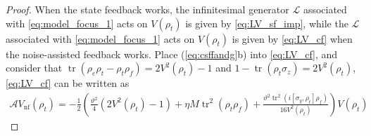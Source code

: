 \documentclass[]{elsarticle}
\begin{document}
\begin{proof}
	When the state feedback works, the infinitesimal generator $\mathcal{L}$ associated with \eqref{eq:model_focus_1} acts on $V(\rho_{t})$ is given by \eqref{eq:LV_sf_imp}, while the $\mathcal{L}$ associated with \eqref{eq:model_focus_1} acts on $V(\rho_{t})$ is given by \eqref{eq:LV_cf} when the noise-assisted feedback works. Place (\ref{eq:csffandg}b) into \eqref{eq:LV_cf}, and consider that $\operatorname{tr}\left(\rho_{e}\rho_{t}-\rho_t\rho_{f}\right)=2V^2\left(\rho_{t}\right)-1$ and $1-\operatorname{tr}(\rho_{t}\sigma_z)=2V^2\left(\rho_{t}\right)$, \eqref{eq:LV_cf} can be written as	
	\begin{equation}\label{eq:LV_cf_final}
		\begin{aligned}
			\mathcal{A}V_{\mathrm{nf}}\left(\rho_{t}\right)=-\frac{1}{2}\left(\frac{\vartheta^2}{4}\left(2V^2\left(\rho_{t}\right)-1\right)+\eta M \operatorname{tr}^{2}\left(\rho_t \rho_{f}\right)+\frac{\vartheta^2 \operatorname{tr}^2\left(i\left[\sigma_y, \rho_t\right]\rho_{f}\right)}{16V^2\left(\rho_{t}\right)}\right)V\left(\rho_{t}\right)
		\end{aligned}
	\end{equation}
	

\end{proof}
\end{document}
